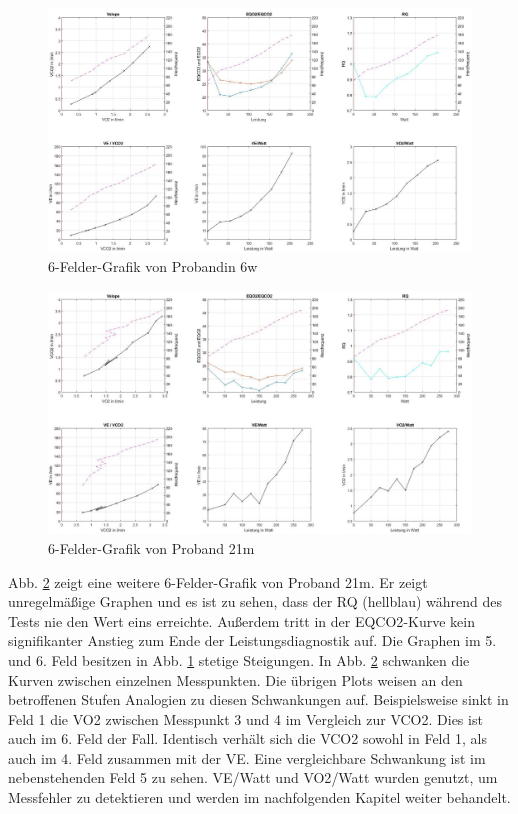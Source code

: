 \begin{figure}[H]
	\centering
	\includegraphics[width=\textwidth]{Bilder/plot_6w.jpg}
	\caption{6-Felder-Grafik von Probandin 6w}
	\label{pic:pic15}
\end{figure}
%
\begin{figure}[H]
	\centering
	\includegraphics[width=\textwidth]{Bilder/plot_21m.jpg}
	\caption{6-Felder-Grafik von Proband 21m}
	\label{pic:pic16}
\end{figure}

Abb. \ref{pic:pic16} zeigt eine weitere 6-Felder-Grafik von Proband 21m. Er zeigt unregelmäßige Graphen und es ist zu sehen, dass der RQ (hellblau) während des Tests nie den Wert eins erreichte. Außerdem tritt in der \acs{EQCO2}-Kurve kein signifikanter Anstieg zum Ende der Leistungsdiagnostik auf. Die Graphen im 5. und 6. Feld besitzen in Abb. \ref{pic:pic15} stetige Steigungen. In Abb. \ref{pic:pic16} schwanken die Kurven zwischen einzelnen Messpunkten. Die übrigen Plots weisen an den betroffenen Stufen Analogien zu diesen Schwankungen auf. Beispielsweise sinkt in Feld 1 die \acs{VO2} zwischen Messpunkt 3 und 4 im Vergleich zur \acs{VCO2}. Dies ist auch im 6. Feld der Fall. Identisch verhält sich die \acs{VCO2} sowohl in Feld 1, als auch im 4. Feld zusammen mit der \acs{VE}. Eine vergleichbare Schwankung ist im nebenstehenden Feld 5 zu sehen. \acs{VE}/Watt und \acs{VO2}/Watt wurden genutzt, um Messfehler zu detektieren und werden im nachfolgenden Kapitel weiter behandelt.

